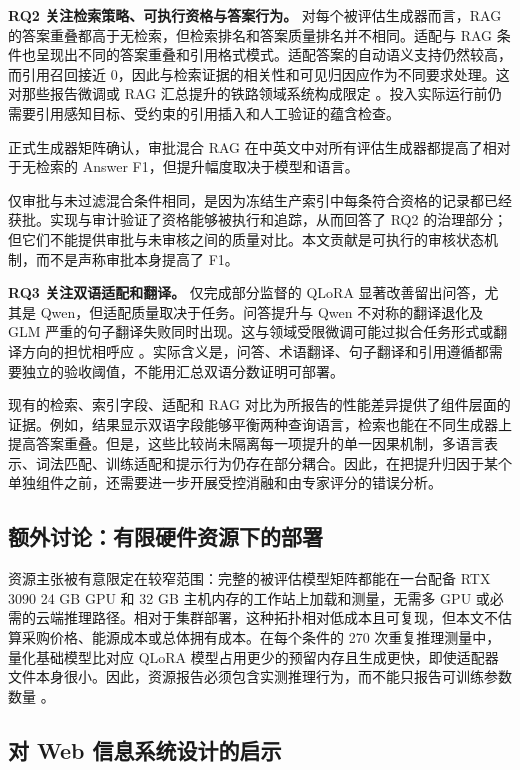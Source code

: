 \textbf{RQ2 关注检索策略、可执行资格与答案行为。} 对每个被评估生成器而言，RAG 的答案重叠都高于无检索，但检索排名和答案质量排名并不相同。适配与 RAG 条件也呈现出不同的答案重叠和引用格式模式。适配答案的自动语义支持仍然较高，而引用召回接近 0，因此与检索证据的相关性和可见归因应作为不同要求处理。这对那些报告微调或 RAG 汇总提升的铁路领域系统构成限定 \citep{li2024rschat,li2025training,luo2025driver,huang2026emergency}。投入实际运行前仍需要引用感知目标、受约束的引用插入和人工验证的蕴含检查。

正式生成器矩阵确认，审批混合 RAG 在中英文中对所有评估生成器都提高了相对于无检索的 Answer F1，但提升幅度取决于模型和语言。

仅审批与未过滤混合条件相同，是因为冻结生产索引中每条符合资格的记录都已经获批。实现与审计验证了资格能够被执行和追踪，从而回答了 RQ2 的治理部分；但它们不能提供审批与未审核之间的质量对比。本文贡献是可执行的审核状态机制，而不是声称审批本身提高了 F1。

\textbf{RQ3 关注双语适配和翻译。} 仅完成部分监督的 QLoRA 显著改善留出问答，尤其是 Qwen，但适配质量取决于任务。问答提升与 Qwen 不对称的翻译退化及 GLM 严重的句子翻译失败同时出现。这与领域受限微调可能过拟合任务形式或翻译方向的担忧相呼应 \citep{hu2024translation,vieira2024translation}。实际含义是，问答、术语翻译、句子翻译和引用遵循都需要独立的验收阈值，不能用汇总双语分数证明可部署。

现有的检索、索引字段、适配和 RAG 对比为所报告的性能差异提供了组件层面的证据。例如，结果显示双语字段能够平衡两种查询语言，检索也能在不同生成器上提高答案重叠。但是，这些比较尚未隔离每一项提升的单一因果机制，多语言表示、词法匹配、训练适配和提示行为仍存在部分耦合。因此，在把提升归因于某个单独组件之前，还需要进一步开展受控消融和由专家评分的错误分析。

\subsection{额外讨论：有限硬件资源下的部署}

资源主张被有意限定在较窄范围：完整的被评估模型矩阵都能在一台配备 RTX 3090 24 GB GPU 和 32 GB 主机内存的工作站上加载和测量，无需多 GPU 或必需的云端推理路径。相对于集群部署，这种拓扑相对低成本且可复现，但本文不估算采购价格、能源成本或总体拥有成本。在每个条件的 270 次重复推理测量中，量化基础模型比对应 QLoRA 模型占用更少的预留内存且生成更快，即使适配器文件本身很小。因此，资源报告必须包含实测推理行为，而不能只报告可训练参数数量 \citep{schwartz2020green,ding2023peft,lv2024full}。

\subsection{对 Web 信息系统设计的启示}

